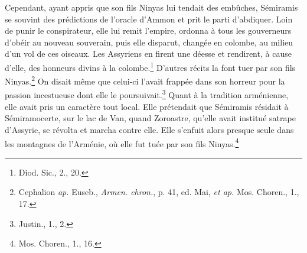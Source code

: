\documentclass[a4paper, 11pt, oneside]{article}
\begin{document}
Cependant, ayant appris que son fils Ninyas lui tendait des embûches, Sémiramis se souvint des prédictions de l'oracle d'Ammon et prit le parti d'abdiquer. Loin de punir le conspirateur, elle lui remit l'empire, ordonna à tous les gouverneurs d'obéir au nouveau souverain, puis elle disparut, changée en colombe, au milieu d'un vol de ces oiseaux. Les Assyriens en firent une déesse et rendirent, à cause d'elle, des honneurs divins à la colombe.\footnote{Diod. Sic., 2., 20.} D'autres récits la font tuer par son fils Ninyas.\footnote{Cephalion \emph{ap.} Euseb., \emph{Armen. chron.}, p. 41, ed. Mai, \emph{et ap.} Mos. Choren., 1., 17.} On disait même que celui-ci l'avait frappée dans son horreur pour la passion incestueuse dont elle le poursuivait.\footnote{Justin., 1., 2.} Quant à la tradition arménienne, elle avait pris un caractère tout local. Elle prétendait que Sémiramis résidait à Sémiramocerte, sur le lac de Van, quand Zoroastre, qu'elle avait institué satrape d'Assyrie, se révolta et marcha contre elle. Elle s'enfuit alors presque seule dans les montagnes de l'Arménie, où elle fut tuée par son fils Ninyas.\footnote{Mos. Choren., 1., 16.}
\end{document}
